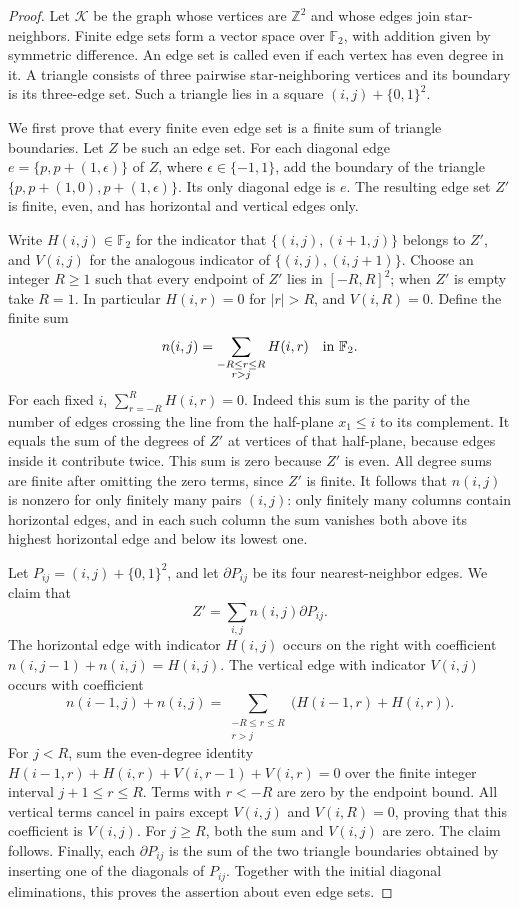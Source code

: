 \begin{proof}
Let \(\mathcal K\) be the graph whose vertices are \(\mathbb Z^2\)
and whose edges join star-neighbors.  Finite edge sets form
a vector space over \(\mathbb F_2\), with addition given by
symmetric difference.  An edge set is called even if each
vertex has even degree in it.  A triangle consists of three
pairwise star-neighboring vertices and its boundary is its
three-edge set.  Such a triangle lies in a square
\((i,j)+\{0,1\}^2\).

We first prove that every finite even edge set is a finite
sum of triangle boundaries.  Let \(Z\) be such an edge set.
For each diagonal edge \(e=\{p,p+(1,\epsilon)\}\) of \(Z\),
where \(\epsilon\in\{-1,1\}\), add the boundary of the triangle
\(\{p,p+(1,0),p+(1,\epsilon)\}\).  Its only diagonal edge
is \(e\).  The resulting edge set \(Z'\) is finite, even,
and has horizontal and vertical edges only.

Write \(H(i,j)\in\mathbb F_2\) for the indicator that
\(\{(i,j),(i+1,j)\}\) belongs to \(Z'\), and
\(V(i,j)\) for the analogous indicator of
\(\{(i,j),(i,j+1)\}\).  Choose an integer \(R\ge1\) such that
every endpoint of \(Z'\) lies in \([-R,R]^2\); when \(Z'\) is
empty take \(R=1\).  In particular \(H(i,r)=0\) for
\(|r|>R\), and \(V(i,R)=0\).  Define the finite sum
\[
 n(i,j)=\sum_{\substack{-R\le r\le R\\r>j}}H(i,r)
                    \quad\hbox{in }\mathbb F_2.
\]
For each fixed \(i\), \(\sum_{r=-R}^R H(i,r)=0\).  Indeed this sum
is the parity of the number of edges crossing the line from
the half-plane \(x_1\le i\) to its complement.  It equals
the sum of the degrees of \(Z'\) at vertices of that
half-plane, because edges inside it contribute twice.
This sum is zero because \(Z'\) is even.  All degree sums
are finite after omitting the zero terms, since \(Z'\) is
finite.  It follows that \(n(i,j)\) is nonzero for only
finitely many pairs \((i,j)\): only finitely many columns
contain horizontal edges, and in each such column the sum
vanishes both above its highest horizontal edge and below
its lowest one.

Let \(P_{ij}=(i,j)+\{0,1\}^2\), and let \(\partial P_{ij}\)
be its four nearest-neighbor edges.  We claim that
\[
                    Z'=\sum_{i,j}n(i,j)\partial P_{ij}.
\]
The horizontal edge with indicator \(H(i,j)\) occurs on
the right with coefficient
\(n(i,j-1)+n(i,j)=H(i,j)\).
The vertical edge with indicator \(V(i,j)\) occurs with
coefficient
\[
 n(i-1,j)+n(i,j)
       =\sum_{\substack{-R\le r\le R\\r>j}}
                          \bigl(H(i-1,r)+H(i,r)\bigr).
\]
For \(j<R\), sum the even-degree identity
\(H(i-1,r)+H(i,r)+V(i,r-1)+V(i,r)=0\)
over the finite integer interval \(j+1\le r\le R\).
Terms with \(r<-R\) are zero by the endpoint bound.
All vertical terms cancel in pairs except \(V(i,j)\) and
\(V(i,R)=0\), proving that this coefficient is \(V(i,j)\).
For \(j\ge R\), both the sum and \(V(i,j)\) are zero.
The claim follows.  Finally, each \(\partial P_{ij}\) is
the sum of the two triangle boundaries obtained by inserting
one of the diagonals of \(P_{ij}\).  Together with the
initial diagonal eliminations, this proves the assertion
about even edge sets.


\end{proof}
